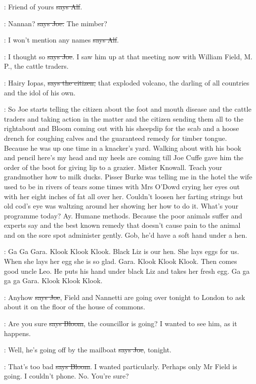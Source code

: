 \bergan:
Friend of yours \sout{says Alf}.

\joe:
Nannan? \sout{says Joe.} The mimber?

\bergan:
I won't mention any names \sout{says Alf}.

\joe:
I thought so \sout{says Joe}.
I saw him up at that meeting now with William
Field, M. P., the cattle traders.

\citizen:
Hairy Iopas, \sout{says the citizen,}
that exploded volcano, the darling of all
countries and the idol of his own.

\Nq:
So Joe starts telling the citizen about the foot and mouth disease and
the cattle traders and taking action in the matter and the citizen sending
them all to the rightabout and Bloom coming out with his sheepdip for the
scab and a hoose drench for coughing calves and the guaranteed remedy
for timber tongue. Because he was up one time in a knacker's yard.
Walking about with his book and pencil here's my head and my heels are
coming till Joe Cuffe gave him the order of the boot for giving lip to a
grazier. Mister Knowall. Teach your grandmother how to milk ducks.
Pisser Burke was telling me in the hotel the wife used to be in rivers of
tears some times with Mrs O'Dowd crying her eyes out with her eight inches
of fat all over her. Couldn't loosen her farting strings but old cod's eye
was waltzing around her showing her how to do it. What's your programme
today? Ay. Humane methods. Because the poor animals suffer and experts
say and the best known remedy that doesn't cause pain to the animal and
on the sore spot administer gently. Gob, he'd have a soft hand under a
hen.

:
Ga Ga Gara. Klook Klook Klook. Black Liz is our hen. She lays eggs
for us. When she lays her egg she is so glad. Gara. Klook Klook Klook.
Then comes good uncle Leo. He puts his hand under black Liz and takes
her fresh egg. Ga ga ga ga Gara. Klook Klook Klook.

\joe:
Anyhow \sout{says Joe},
Field and Nannetti are going over tonight to London
to ask about it on the floor of the house of commons.

\Bloom:
Are you sure \sout{says Bloom},
the councillor is going? I wanted to see him,
as it happens.

\joe:
Well, he's going off by the mailboat
\sout{says Joe}, tonight.

\Bloom:
That's too bad \sout{says Bloom}.
I wanted particularly. Perhaps only Mr Field
is going. I couldn't phone. No. You're sure?

